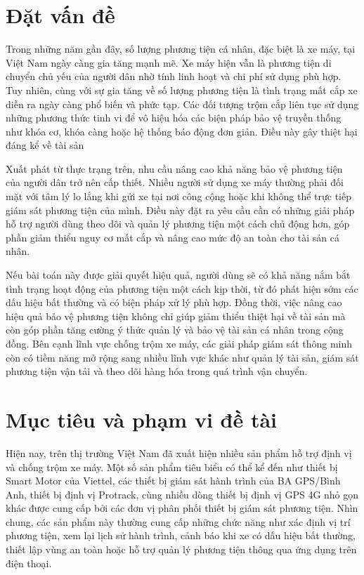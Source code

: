 \documentclass[../DoAn.tex]{subfiles}
\begin{document}
\section{Đặt vấn đề}
\label{section:1.1}
Trong những năm gần đây, số lượng phương tiện cá nhân, đặc biệt là xe máy, tại Việt Nam ngày càng gia tăng mạnh mẽ. Xe máy hiện vẫn là phương tiện di chuyển chủ yếu của người dân nhờ tính linh hoạt và chi phí sử dụng phù hợp. Tuy nhiên, cùng với sự gia tăng về số lượng phương tiện là tình trạng mất cắp xe diễn ra ngày càng phổ biến và phức tạp. Các đối tượng trộm cắp liên tục sử dụng những phương thức tinh vi để vô hiệu hóa các biện pháp bảo vệ truyền thống như khóa cơ, khóa càng hoặc hệ thống báo động đơn giản. Điều này gây thiệt hại đáng kể về tài sản

Xuất phát từ thực trạng trên, nhu cầu nâng cao khả năng bảo vệ phương tiện của người dân trở nên cấp thiết. Nhiều người sử dụng xe máy thường phải đối mặt với tâm lý lo lắng khi gửi xe tại nơi công cộng hoặc khi không thể trực tiếp giám sát phương tiện của mình. Điều này đặt ra yêu cầu cần có những giải pháp hỗ trợ người dùng theo dõi và quản lý phương tiện một cách chủ động hơn, góp phần giảm thiểu nguy cơ mất cắp và nâng cao mức độ an toàn cho tài sản cá nhân.

Nếu bài toán này được giải quyết hiệu quả, người dùng sẽ có khả năng nắm bắt tình trạng hoạt động của phương tiện một cách kịp thời, từ đó phát hiện sớm các dấu hiệu bất thường và có biện pháp xử lý phù hợp. Đồng thời, việc nâng cao hiệu quả bảo vệ phương tiện không chỉ giúp giảm thiểu thiệt hại về tài sản mà còn góp phần tăng cường ý thức quản lý và bảo vệ tài sản cá nhân trong cộng đồng. Bên cạnh lĩnh vực chống trộm xe máy, các giải pháp giám sát thông minh còn có tiềm năng mở rộng sang nhiều lĩnh vực khác như quản lý tài sản, giám sát phương tiện vận tải và theo dõi hàng hóa trong quá trình vận chuyển.


\section{Mục tiêu và phạm vi đề tài}
\label{section:1.2}

Hiện nay, trên thị trường Việt Nam đã xuất hiện nhiều sản phẩm hỗ trợ định vị và chống trộm xe máy. Một số sản phẩm tiêu biểu có thể kể đến như thiết bị Smart Motor của Viettel, các thiết bị giám sát hành trình của BA GPS/Bình Anh, thiết bị định vị Protrack, cùng nhiều dòng thiết bị định vị GPS 4G nhỏ gọn khác được cung cấp bởi các đơn vị phân phối thiết bị giám sát phương tiện. Nhìn chung, các sản phẩm này thường cung cấp những chức năng như xác định vị trí phương tiện, xem lại lịch sử hành trình, cảnh báo khi xe có dấu hiệu bất thường, thiết lập vùng an toàn hoặc hỗ trợ quản lý phương tiện thông qua ứng dụng trên điện thoại.
\end{document}
